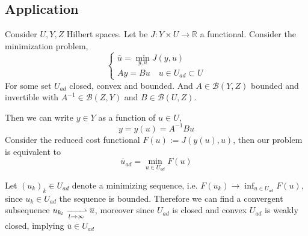 \subsection{Application}
Consider $U, Y, Z$ Hilbert spaces. Let be  $J: Y\times U \rightarrow \mathbb{R}$ a functional. Consider the minimization problem,
\begin{equation*}
	\left\lbrace
	\begin{array}{l}
	\overline{u}=\underset{y,u}{\min} J(y,u) \\
	Ay=Bu \quad u \in U_{ad} \subset U
	\end{array}
	\right.
\end{equation*}
For some set $U_{ad}$ closed, convex and bounded. And $A \in \mathcal{B}(Y,Z)$ bounded and invertible with $A^{-1}\in \mathcal{B}(Z, Y)$ and $B\in \mathcal{B}(U, Z)$.

Then we can write $y \in Y$ as a function of $u \in U$,
\[
y=y(u)=A^{-1}Bu
\]
Consider the reduced cost functional  $	F(u):=J(y(u), u)$, then our problem is equivalent to
\[
	\overline{u}_{ad}=\min_{u \in U_{ad}} F(u) 
\]


Let $(u_k)_k \in U_{ad}$ denote a minimizing sequence, i.e. $F(u_k) \rightarrow \inf_{u\in U_{ad}}F(u)$, since $u_k \in U_{ad}$ the sequence is bounded. Therefore we can find a convergent subsequence $u_{k_{l}} \xrightharpoonup[l\rightarrow \infty]{} \overline{u}$, moreover since $U_{ad}$ is closed and convex $U_{ad}$ is weakly closed, implying $\overline{u} \in U_{ad}$

